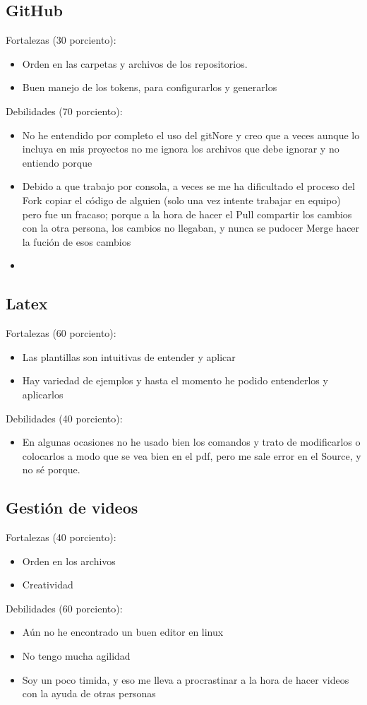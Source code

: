 \documentclass{article}
\begin{document}
\subsection{GitHub}
Fortalezas (30 porciento): 
{
\begin{itemize}
\item{Orden en las carpetas y archivos de los repositorios.}
\item{Buen manejo de los tokens, para configurarlos y generarlos }
\end{itemize}
}
Debilidades (70 porciento): 
{
\begin{itemize}
\item{No he entendido por completo el uso del gitNore y creo que a veces aunque lo incluya en mis proyectos no me ignora los archivos que debe ignorar y no entiendo porque}
\item{Debido a que trabajo por consola, a veces se me ha dificultado el proceso del Fork copiar el código de alguien (solo una vez intente trabajar en equipo) pero fue un fracaso; porque a la hora de hacer el Pull compartir los cambios con la otra persona, los cambios no llegaban, y nunca se pudocer Merge hacer la fución de esos cambios}
\item{}
\end{itemize}
}
\subsection{Latex}
Fortalezas (60 porciento):
{
\begin{itemize}
\item{Las plantillas son intuitivas de entender y aplicar}
\item{Hay variedad de ejemplos y hasta el momento he podido entenderlos y aplicarlos}
\end{itemize}
}
Debilidades (40 porciento):
{
\begin{itemize}
\item{En algunas ocasiones no he usado bien los comandos y trato de modificarlos o colocarlos a modo que se vea bien en el pdf, pero me sale error en el Source, y no sé porque.}
\end{itemize}
}
\subsection{Gestión de videos}
Fortalezas (40 porciento):
{
\begin{itemize}
\item{Orden en los archivos}
\item{Creatividad}
\end{itemize}
}
Debilidades (60 porciento):
{
\begin{itemize}
\item{Aún no he encontrado un buen editor en linux}
\item{No tengo mucha agilidad}
\item{Soy un poco timida, y eso me lleva a procrastinar a la hora de hacer videos con la ayuda de otras personas}
\end{itemize}
}
 
\end{document}
